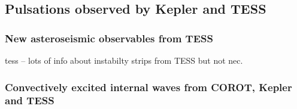 {\color{blue}
\subsection{Pulsations observed by Kepler and TESS}



\subsubsection{New asteroseismic observables from TESS}

tess -- lots of info about instabilty strips from TESS but not nec. 

\subsubsection{Convectively excited internal waves from COROT, Kepler and TESS}


}